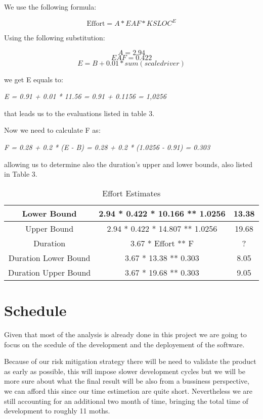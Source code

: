 \documentclass[11pt]{article} %
\newcommand{\formul}[1]{
\vspace{0.2cm}
\centerline{ \textit{ #1 } }
\vspace{0.2cm}
}
\begin{document}
We use the following formula:

$$ \text{Effort} = A * EAF * KSLOC ^ E $$

Using the following substitution:

$$ A = 2.94 $$
$$ EAF = 0.422 $$
$$ E = B + 0.01 * sum(scale driver) $$

we get E equals to: 

\formul{E = 0.91 + 0.01 * 11.56 = 0.91 + 0.1156 = 1,0256}

that leads us to the evaluations listed in table 3.

Now we need to calculate F as:

\formul{F = 0.28 + 0.2 * (E - B) = 0.28 + 0.2 * (1.0256 - 0.91) = 0.303}

allowing us to determine also the duration's upper and lower bounds, also
 listed in Table 3.

\begin{table}[h]
\centering
\bgroup
\def\arraystretch{1.5}
	\begin{tabular}{| c | c | c |}
	\hline
	Lower Bound & 2.94 * 0.422 * 10.166 ** 1.0256 & 13.38 \\ \hline
	Upper Bound & 2.94 * 0.422 * 14.807 ** 1.0256 & 19.68 \\ \hline \hline
	Duration & 3.67 * Effort ** F & ? \\ \hline \hline
	Duration Lower Bound & 3.67 * 13.38 ** 0.303 & 8.05 \\ \hline
	Duration Upper Bound & 3.67 * 19.68 ** 0.303 & 9.05 \\ \hline
	\end{tabular}
\egroup
\caption{Effort Estimates}
\end{table}



\newpage
\section{Schedule}

Given that most of the analysis is already done in this project we are going to focus on the scedule of the development and the deployement of the software.

Because of our risk mitigation strategy there will be need to validate the product as early as possible, this will impose slower development cycles but we will be more sure about what the final result will be also from a bussiness perspective, we can afford this since our time estimetion are quite short. Nevertheless we are still accounting for an additional two month of time, bringing the total time of development to roughly 11 moths.
\end{document}
